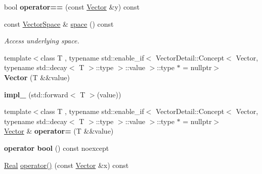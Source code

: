 \begin{DoxyCompactItemize}
\item 
\hypertarget{classSpacy_1_1Vector_a0d634e69572e8da07c3c7056ec911208}{bool {\bfseries operator==} (const \hyperlink{classSpacy_1_1Vector}{Vector} \&y) const }\label{classSpacy_1_1Vector_a0d634e69572e8da07c3c7056ec911208}

\item 
\hypertarget{classSpacy_1_1Vector_a8a549d4ed045ddf563afca5bc942397b}{const \hyperlink{classSpacy_1_1VectorSpace}{Vector\-Space} \& \hyperlink{classSpacy_1_1Vector_a8a549d4ed045ddf563afca5bc942397b}{space} () const }\label{classSpacy_1_1Vector_a8a549d4ed045ddf563afca5bc942397b}

\begin{DoxyCompactList}\small\item\em Access underlying space. \end{DoxyCompactList}\item 
\hypertarget{classSpacy_1_1Vector_a5c5ad7607366066bb752d78611d899cf}{{\footnotesize template$<$class T , typename std\-::enable\-\_\-if$<$ Vector\-Detail\-::\-Concept$<$ Vector, typename std\-::decay$<$ T $>$\-::type $>$\-::value $>$\-::type $\ast$  = nullptr$>$ }\\{\bfseries Vector} (T \&\&value)}\label{classSpacy_1_1Vector_a5c5ad7607366066bb752d78611d899cf}

\item 
\hypertarget{classSpacy_1_1Vector_a0d1fb9e6a52e052c60c3257cb37c3267}{{\bfseries impl\-\_\-} (std\-::forward$<$ T $>$(value))}\label{classSpacy_1_1Vector_a0d1fb9e6a52e052c60c3257cb37c3267}

\item 
\hypertarget{classSpacy_1_1Vector_a1b2ea8c4f0e52b3ca5f6900537daed02}{{\footnotesize template$<$class T , typename std\-::enable\-\_\-if$<$ Vector\-Detail\-::\-Concept$<$ Vector, typename std\-::decay$<$ T $>$\-::type $>$\-::value $>$\-::type $\ast$  = nullptr$>$ }\\\hyperlink{classSpacy_1_1Vector}{Vector} \& {\bfseries operator=} (T \&\&value)}\label{classSpacy_1_1Vector_a1b2ea8c4f0e52b3ca5f6900537daed02}

\item 
\hypertarget{classSpacy_1_1Vector_a3285df21a258aaf9d35dd3981ff0aa74}{{\bfseries operator bool} () const noexcept}\label{classSpacy_1_1Vector_a3285df21a258aaf9d35dd3981ff0aa74}

\item 
\hypertarget{classSpacy_1_1Vector_af6f1ec896b05538a931e72dbecdebbb1}{\hyperlink{classSpacy_1_1Real}{Real} \hyperlink{classSpacy_1_1Vector_af6f1ec896b05538a931e72dbecdebbb1}{operator()} (const \hyperlink{classSpacy_1_1Vector}{Vector} \&x) const }\label{classSpacy_1_1Vector_af6f1ec896b05538a931e72dbecdebbb1}


\end{DoxyCompactItemize}
